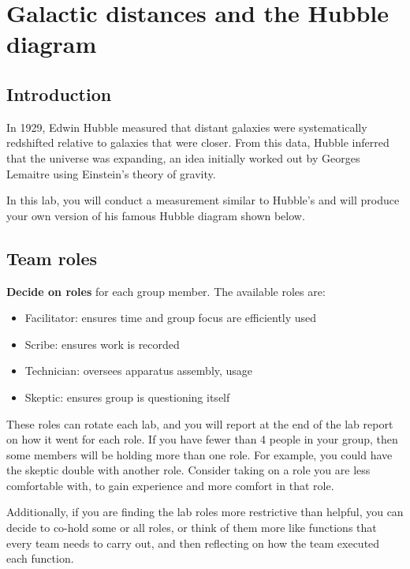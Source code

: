 \chapter{Galactic distances and the Hubble diagram}



\section{Introduction}

In 1929, Edwin Hubble measured that distant galaxies were
systematically redshifted relative to galaxies that were closer. From this
data, Hubble inferred that the universe was expanding, an idea initially
worked out by Georges Lemaitre using Einstein's theory of gravity.

In this lab, you will conduct a measurement similar to Hubble's and will
produce your own version of his famous Hubble diagram shown below.

\section{Team roles}

\textbf{Decide on roles} for each group member. The available roles are:

\begin{itemize}
	\item Facilitator: ensures time and group focus are efficiently used
	\item Scribe: ensures work is recorded
	\item Technician: oversees apparatus assembly, usage
	\item Skeptic: ensures group is questioning itself
\end{itemize}

These roles can rotate each lab, and you will report at the end of the lab report on how it went for each role. If you have fewer than 4 people in your group, then some members will be holding more than one role. For example, you could have the skeptic double with another role. Consider taking on a role you are less comfortable with, to gain experience and more comfort in that role.

Additionally, if you are finding the lab roles more restrictive than helpful, you can decide to co-hold some or all roles, or think of them more like functions that every team needs to carry out, and then reflecting on how the team executed each function.

